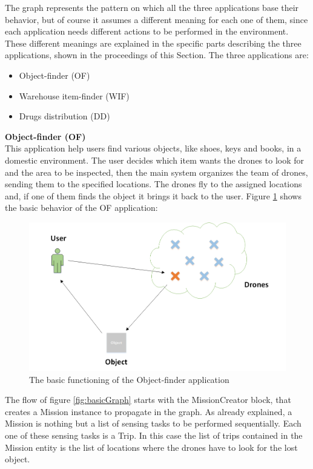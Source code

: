 The graph represents the pattern on which all the three applications base their behavior, but of course it assumes a different meaning for each one of them, since each application needs different actions to be performed in the environment.
These different meanings are explained in the specific parts describing the three applications, shown in the proceedings of this Section.
The three applications are:

\begin{itemize}
\item {Object-finder (OF)}
\item {Warehouse item-finder (WIF)}
\item {Drugs distribution (DD)}
\end{itemize}


\textbf{Object-finder (OF)}
\\

This application help users find various objects, like shoes, keys and books, in a domestic environment.
The user decides which item wants the drones to look for and the area to be inspected, then
the main system organizes the team of drones, sending them to the specified locations.
The drones fly to the assigned locations and, if one of them finds the object it brings it back to the user.
Figure \ref{fig:OF} shows the basic behavior of the OF application:


\begin{figure}[h!]
  \centering
  \includegraphics[width=\linewidth]{pictures/OF.png}
  \caption{The basic functioning of the Object-finder application}
  \label{fig:OF}
\end{figure}


The flow of figure \ref{fig:basicGraph} starts with the MissionCreator block, that creates a Mission instance to propagate in the graph.
As already explained, a Mission is nothing but a list of sensing tasks to be performed sequentially.
Each one of these sensing tasks is a Trip.
In this case the list of trips contained in the Mission entity is the list of locations where the drones have to look for the lost object.

